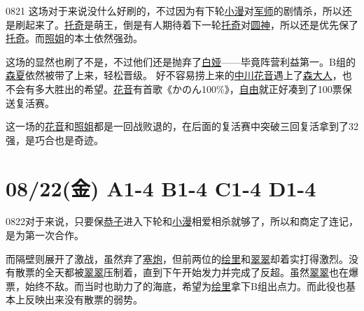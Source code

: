 0821 这场对于来说没什么好刷的，不过因为有下轮\uline{小漫}对\uline{军师}的剧情杀，所以还是刷起来了。\uline{托奇}是萌王，倒是有人期待着下一轮\uline{托奇}对\uline{圆神}，所以还是优先保了\uline{托奇}。而\uline{照姐}的本土依然强劲。

这场的显然也刷了不是，不过他们还是抛弃了\uline{白娅}——毕竟阵营利益第一。B组的\uline{森夏}依然被带了上来，轻松晋级。
好不容易捞上来的\uline{中川花音}遇上了\uline{森大人}，也不会有多大胜出的希望。\uline{花音}有首歌{《\kasho かのん100\%》}，\uline{自由}就正好凑到了100票保送复活赛。

这一场的\uline{花音}和\uline{照姐}都是一回战败退的，在后面的复活赛中突破三回复活拿到了32强，是巧合也是奇迹。

\section{08/22(金) A1-4 B1-4 C1-4 D1-4}


0822对于来说，只要保\uline{恭子}进入下轮和\uline{小漫}相爱相杀就够了，所以和商定了连记，是为第一次合作。

而隔壁则展开了激战，虽然弃了\uline{塞炮}，但前两位的\uline{绘里}和\uline{翠翠}却着实打得激烈。没有散票的全天都被\uline{翠翠}压制着，直到下午开始发力并完成了反超。虽然\uline{翠翠}也在爆票，始终不敌。而当时也助力了的海底，希望为\uline{绘里}拿下B组出点力。而此役也基本上反映出来没有散票的弱势。

